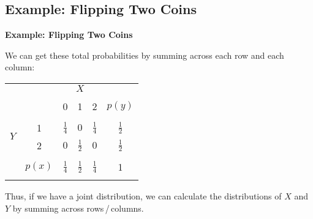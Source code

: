 \documentclass[compress]{beamer}        %
\makeatletter
\newcommand{\tcb}{\textcolor{beamer@blendedblue}}
\makeatother
\begin{document}
\subsection{Example: Flipping Two Coins}
\begin{frame}{\bf \tcb{Example: Flipping Two Coins}}

We can get these total probabilities by summing across each row and each column:\\[-0.5cm]
\begin{center}
\begin{tabular}{c|c|ccc|c|}
\multicolumn{2}{c}{} & \multicolumn{3}{c}{$X$} & \multicolumn{1}{c}{}\\
\cline{2-6}
&&&&&\\[-0.4cm]
&&                          0 & 1 & 2 & $p(y)$\\
\cline{2-6}
&&&&&\\[-0.3cm]
\multirow{2}{*}{$Y$} & 1 & $\frac{1}{4}$ &  $0$ & $\frac{1}{4}$ & $\frac{1}{2}$ \\[0.1cm]
                     & 2 & $0$           &  $\frac{1}{2}$  & $0$ & $\frac{1}{2}$ \\[0.1cm]
\cline{2-6}
&&&&&\\[-0.3cm]
& $p(x)$ & $\frac{1}{4}$ & $\frac{1}{2}$ & $\frac{1}{4}$ & 1 \\[0.1cm]
\cline{2-6}
\multicolumn{6}{c}{}
\end{tabular}
\end{center}
Thus, if we have a joint distribution, we can calculate the distributions of $X$ and $Y$ by summing across rows\,/\,columns.

\end{frame}
\end{document}
